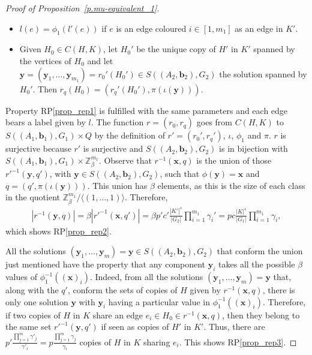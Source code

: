 \documentclass[10pt]{article}
\newcommand{\Z}{\mathbb Z}
\begin{document}
\begin{proof}[Proof of Proposition~\ref{p.mu-equivalent_1}]
\begin{itemize}
			\item $l(e)=\phi_1(l'(e))$ if $e$ is an edge coloured $i\in[1,m_1]$ as an edge in $K'$.
			\item
Given $H_0\in C(H,K)$, let $H_0'$ be the unique copy of $H'$ in $K'$ spanned by the vertices of $H_0$ and let $\mathbf{y}=(\mathbf{y}_1,\ldots,\mathbf{y}_{m_1})=r_0'(H_0')\in S((A_2,\mathbf{b}_2),G_2)$ the solution spanned by $H_0'$. Then
		 $r_q(H_0)=(r_q'(H_0'),\pi(\iota(\mathbf{y})))$. 
		\end{itemize}


	Property RP\ref{prop_rep1} is fulfilled with the same parameters and each edge bears a label given by $l$. The function $r=(r_0,r_q)$ goes from $C(H,K)$ to $S((A_1,\mathbf{b}_1),G_1)\times Q$ by the definition of $r'=(r_0',r_q')$, $\iota$, $\phi_1$ and $\pi$. $r$ is surjective because $r'$ is surjective and $S((A_2,\mathbf{b}_2),G_2)$ is in bijection with $S((A_1,\mathbf{b}_1),G_1)\times \Z_{\beta}^{m_1}$. Observe that $r^{-1}(\mathbf{x},q)$ is the union of those $r'^{-1}(\mathbf{y},q')$, with $\mathbf{y}\in S((A_2,\mathbf{b}_2),G_2)$, 
	such that $\phi(\mathbf{y})=\mathbf{x}$ and $q=(q',\pi(\iota(\mathbf{y})))$. This union has $\beta$ elements, as this is the size of each class in the quotient $\Z_\beta^{m_1}/\langle(1,\ldots,1)\rangle$. Therefore,
	\begin{align}
		\left|r^{-1}(\mathbf{y},q)\right|=\beta \left|r'^{-1}(\mathbf{x},q')\right|=\beta p'c' \frac{|K'|^s}{|G_2|} \prod_{i=1}^{m_1}  \gamma_i' =p c \frac{|K|^s}{|G_1|} \prod_{i=1}^{m_1}  \gamma_i, \nonumber
	\end{align}
	which shows RP\ref{prop_rep2}.
	
All the solutions $(\mathbf{y}_1,\ldots,\mathbf{y}_m)=\mathbf{y}\in S((A_2,\mathbf{b}_2),G_2)$ that conform the union just mentioned have the property that any component $\mathbf{y}_i$ takes all the possible $\beta$ values of $\phi_1^{-1} ((\mathbf{x})_i)$. Indeed, from all the solutions $(\mathbf{y}_1,\ldots,\mathbf{y}_m)=\mathbf{y}$ that, along with the $q'$, conform the sets of copies of $H$ given by $r^{-1}(\mathbf{x},q)$, there is only one solution $\mathbf{y}$ with $\mathbf{y}_i$ having a particular value in $\phi_1^{-1}((\mathbf{x})_i)$. Therefore,
	if two copies of $H$ in $K$ share an edge $e_i\in H_0\in r^{-1}(\mathbf{x},q)$, then they belong to the same set $r'^{-1}(\mathbf{y},q')$ if seen as copies of $H'$ in $K'$. Thus, there are $p'\frac{\prod_{j=1}^m  \gamma'_j}{\gamma'_i}=p\frac{\prod_{j=1}^m  \gamma_j}{\gamma_i}$ copies of $H$ in $K$ sharing $e_i$. This shows RP\ref{prop_rep3}.
	

\end{proof}
\end{document}
